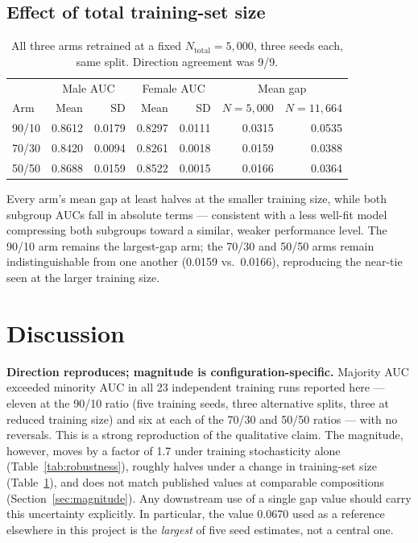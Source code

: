 \documentclass[11pt]{article}
\begin{document}
\subsection{Effect of total training-set size}

\begin{table}[H]
\centering
\begin{tabular}{lrrrrrr}
\toprule
& \multicolumn{2}{c}{Male AUC} & \multicolumn{2}{c}{Female AUC} & \multicolumn{2}{c}{Mean gap} \\
Arm & Mean & SD & Mean & SD & $N{=}5{,}000$ & $N{=}11{,}664$ \\
\midrule
90/10 & 0.8612 & 0.0179 & 0.8297 & 0.0111 & 0.0315 & 0.0535 \\
70/30 & 0.8420 & 0.0094 & 0.8261 & 0.0018 & 0.0159 & 0.0388 \\
50/50 & 0.8688 & 0.0159 & 0.8522 & 0.0015 & 0.0166 & 0.0364 \\
\bottomrule
\end{tabular}
\caption{All three arms retrained at a fixed $N_{\text{total}}=5{,}000$, three seeds each, same split. Direction agreement was 9/9.}
\label{tab:nsens}
\end{table}

Every arm's mean gap at least halves at the smaller training size, while both subgroup AUCs fall in absolute terms --- consistent with a less well-fit model compressing both subgroups toward a similar, weaker performance level. The 90/10 arm remains the largest-gap arm; the 70/30 and 50/50 arms remain indistinguishable from one another (0.0159 vs.\ 0.0166), reproducing the near-tie seen at the larger training size.

\section{Discussion}
\label{sec:discussion}

\textbf{Direction reproduces; magnitude is configuration-specific.} Majority AUC exceeded minority AUC in all 23 independent training runs reported here --- eleven at the 90/10 ratio (five training seeds, three alternative splits, three at reduced training size) and six at each of the 70/30 and 50/50 ratios --- with no reversals. This is a strong reproduction of the qualitative claim. The magnitude, however, moves by a factor of 1.7 under training stochasticity alone (Table~\ref{tab:robustness}), roughly halves under a change in training-set size (Table~\ref{tab:nsens}), and does not match published values at comparable compositions (Section~\ref{sec:magnitude}). Any downstream use of a single gap value should carry this uncertainty explicitly. In particular, the value 0.0670 used as a reference elsewhere in this project is the \emph{largest} of five seed estimates, not a central one.
\end{document}

